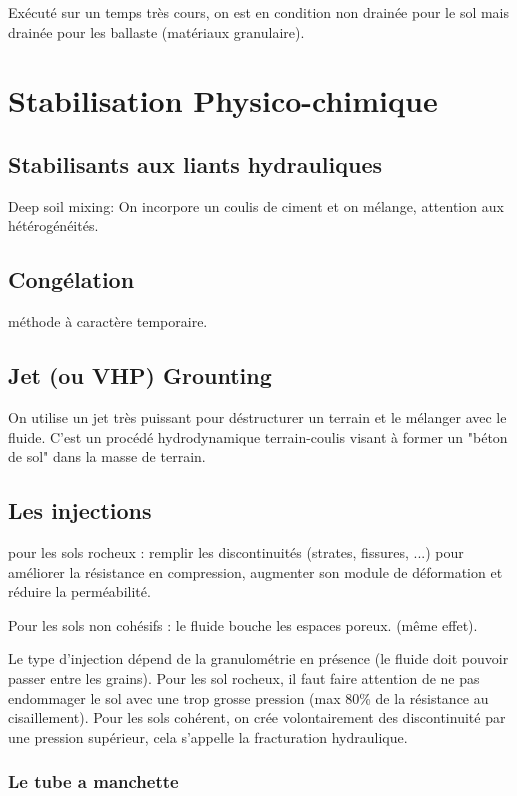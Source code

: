 Exécuté sur un temps très cours, on est en condition non drainée pour le sol mais drainée pour les ballaste (matériaux granulaire).

\section{Stabilisation Physico-chimique}

\subsection{Stabilisants aux liants hydrauliques}

Deep soil mixing: On incorpore un coulis de ciment et on mélange, attention aux hétérogénéités.

\subsection{Congélation}

méthode à caractère temporaire.

\subsection{Jet (ou VHP) Grounting}

On utilise un jet très puissant pour déstructurer un terrain et le mélanger avec le fluide. C'est un procédé hydrodynamique terrain-coulis visant à former un "béton de sol" dans la masse de terrain.

\subsection{Les injections}

pour les sols rocheux : remplir les discontinuités (strates, fissures, ...) pour améliorer la résistance en compression, augmenter son module de déformation et réduire la perméabilité. 

Pour les sols non cohésifs : le fluide bouche les espaces poreux. (même effet).

Le type d'injection dépend de la granulométrie en présence (le fluide doit pouvoir passer entre les grains). Pour les sol rocheux, il faut faire attention de ne pas endommager le sol avec une trop grosse pression (max 80\% de la résistance au cisaillement). Pour les sols cohérent, on crée volontairement des discontinuité par une pression supérieur, cela s'appelle la fracturation hydraulique.

\subsubsection{Le tube a manchette}

